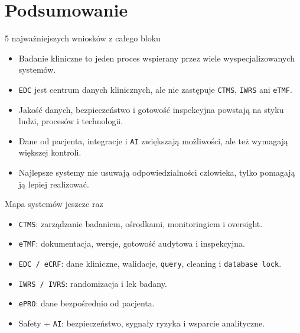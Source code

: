 \section{Podsumowanie}


\begin{frame}{5 najważniejszych wniosków z całego bloku}
  \begin{itemize}
    \item Badanie kliniczne to jeden proces wspierany przez wiele wyspecjalizowanych systemów.
    \item \texttt{EDC} jest centrum danych klinicznych, ale nie zastępuje \texttt{CTMS}, \texttt{IWRS} ani \texttt{eTMF}.
    \item Jakość danych, bezpieczeństwo i gotowość inspekcyjna powstają na styku ludzi, procesów i technologii.
    \item Dane od pacjenta, integracje i \texttt{AI} zwiększają możliwości, ale też wymagają większej kontroli.
    \item Najlepsze systemy nie usuwają odpowiedzialności człowieka, tylko pomagają ją lepiej realizować.
  \end{itemize}
\end{frame}

\begin{frame}{Mapa systemów jeszcze raz}
  \begin{itemize}
    \item \texttt{CTMS}: zarządzanie badaniem, ośrodkami, monitoringiem i oversight.
    \item \texttt{eTMF}: dokumentacja, wersje, gotowość audytowa i inspekcyjna.
    \item \texttt{EDC / eCRF}: dane kliniczne, walidacje, \texttt{query}, cleaning i \texttt{database lock}.
    \item \texttt{IWRS / IVRS}: randomizacja i lek badany.
    \item \texttt{ePRO}: dane bezpośrednio od pacjenta.
    \item Safety + \texttt{AI}: bezpieczeństwo, sygnały ryzyka i wsparcie analityczne.
  \end{itemize}
\end{frame}

